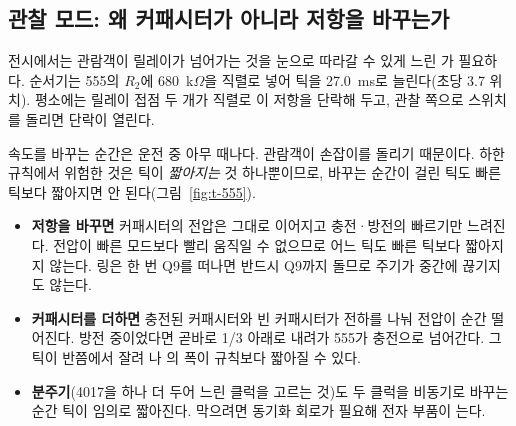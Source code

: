 \subsection{관찰 모드: 왜 커패시터가 아니라 저항을 바꾸는가}

전시에서는 관람객이 릴레이가 넘어가는 것을 눈으로 따라갈 수 있게 느린 가
필요하다. 순서기는 555의 $R_2$에 680~k$\Omega$을 직렬로 넣어 틱을 27.0~ms로 늘린다(초당 3.7 위치). 평소에는
릴레이 접점 두 개가 직렬로 이 저항을 단락해 두고, 관찰 쪽으로 스위치를 돌리면 단락이 열린다.

\Why 속도를 바꾸는 순간은 운전 중 아무 때나다. 관람객이 손잡이를 돌리기 때문이다. 하한 규칙에서 위험한 것은
틱이 \emph{짧아지는} 것 하나뿐이므로, 바꾸는 순간이 걸린 틱도 빠른 틱보다 짧아지면 안 된다(그림~\ref{fig:t-555}).

\begin{itemize}
\item \textbf{저항을 바꾸면} 커패시터의 전압은 그대로 이어지고 충전·방전의 빠르기만 느려진다. 전압이 빠른
모드보다 빨리 움직일 수 없으므로 어느 틱도 빠른 틱보다 짧아지지 않는다. 링은 한 번 Q9를 떠나면 반드시 Q9까지
돌므로 주기가 중간에 끊기지도 않는다.
\item \textbf{커패시터를 더하면} 충전된 커패시터와 빈 커패시터가 전하를 나눠 전압이 순간 떨어진다. 방전 중이었다면
곧바로 1/3 아래로 내려가 555가 충전으로 넘어간다. 그 틱이 반쯤에서 잘려 나 의 폭이
규칙보다 짧아질 수 있다.
\item \textbf{분주기}(4017을 하나 더 두어 느린 클럭을 고르는 것)도 두 클럭을 비동기로 바꾸는 순간 틱이 임의로
짧아진다. 막으려면 동기화 회로가 필요해 전자 부품이 는다.
\end{itemize}

